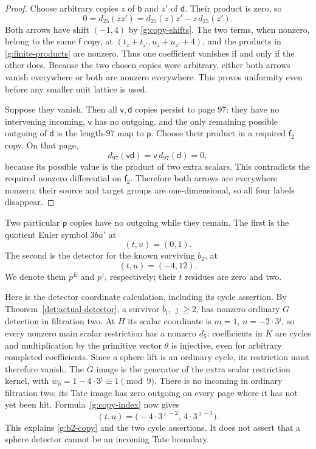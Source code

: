 \documentclass[11pt]{article}
\theoremstyle{definition}
\theoremstyle{remark}
\numberwithin{equation}{section}
\begin{document}
\begin{proof}
Choose arbitrary copies $z$ of $\mathsf b$ and $z'$
of $\mathsf d$.  Their product is zero, so
\[
 0=d_{25}(zz')=d_{25}(z)z'-z\,d_{25}(z').
\]
Both arrows have shift $(-1,4)$ by
\eqref{g:copy-shifts}.  The two terms, when nonzero,
belong to the same $\mathsf f$ copy, at
$(t_z+t_{z'},u_z+u_{z'}+4)$, and the products in
\eqref{g:finite-products} are nonzero.  Thus one
coefficient vanishes if and only if the other does.
Because the two chosen copies were arbitrary, either
both arrows vanish everywhere or both are nonzero
everywhere.  This proves uniformity even before any
smaller unit lattice is used.

Suppose they vanish.  Then all $\mathsf v,\mathsf d$
copies persist to page $97$: they have no intervening
incoming, $\mathsf v$ has no outgoing, and the only
remaining possible outgoing of $\mathsf d$ is the
length-$97$ map to $\mathsf p$.  Choose their product
in a required $\mathsf f_2$ copy.  On that page,
\[
 d_{97}(\mathsf v\mathsf d)
   =\mathsf v\,d_{97}(\mathsf d)=0,
\]
because its possible value is the product of two
extra scalars.  This contradicts the required
nonzero differential on $\mathsf f_2$.  Therefore
both arrows are everywhere nonzero; their source
and target groups are one-dimensional, so all four
labels disappear.
\end{proof}

Two particular $\mathsf p$ copies have no outgoing while
they remain.  The first is the quotient Euler symbol
$3bu'$ at
\begin{equation}\label{g:Euler-copy}
 (t,u)=(0,1).
\end{equation}
The second is the detector for the known surviving
$b_2$, at
\begin{equation}\label{g:b2-copy}
 (t,u)=(-4,12).
\end{equation}
We denote them $p^E$ and $p^\dagger$, respectively;
their $t$ residues are zero and two.

Here is the detector coordinate calculation, including its
cycle assertion.  By Theorem~\ref{det:actual-detector},
a survivor $b_{\jmath}$, $\jmath\ge2$, has nonzero
ordinary $G$ detection in filtration two.  At $H$ its
scalar coordinate is $m=1$, $n=-2\cdot3^{\jmath}$,
so every nonzero main scalar restriction has a nonzero $d_5$:
coefficients in $K$ are cycles and multiplication by the
primitive vector $\theta$ is injective, even for arbitrary
completed coefficients.  Since a sphere lift is an ordinary cycle, its
restriction must therefore vanish.  The $G$ image is
the generator of the extra scalar restriction kernel,
with $w_0=1-4\cdot3^{\jmath}\equiv1\pmod9$.
There is no incoming in ordinary filtration two; its
Tate image has zero outgoing on every page where it
has not yet been hit.  Formula~\eqref{g:copy-index}
now gives
\begin{equation}\label{g:detector-coordinates}
 (t,u)=
 \bigl(-4\cdot3^{\jmath-2},\,4\cdot3^{\jmath-1}\bigr).
\end{equation}
This explains \eqref{g:b2-copy} and the two cycle
assertions.  It does not assert that a sphere detector
cannot be an incoming Tate boundary.
\end{document}
